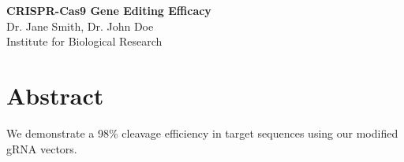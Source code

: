 \documentclass{article}
\begin{document}
\Huge
\begin{center}
\textbf{CRISPR-Cas9 Gene Editing Efficacy} \\
\vspace{1cm}
\Large Dr. Jane Smith, Dr. John Doe \\
\normalsize Institute for Biological Research
\end{center}
\vspace{4cm}
\section*{Abstract}
We demonstrate a 98\% cleavage efficiency in target sequences using our modified gRNA vectors.
\end{document}
